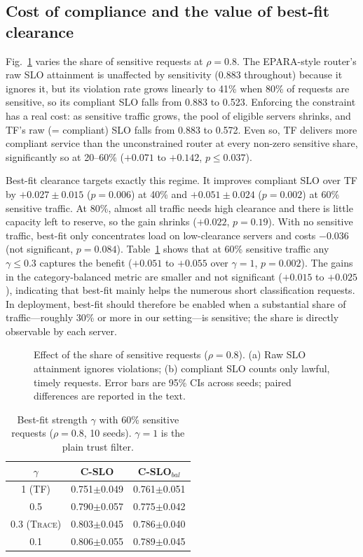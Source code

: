 \documentclass[journal]{IEEEtran}
\newcommand{\sys}{\textsc{Trace}}
\begin{document}
\subsection{Cost of compliance and the value of best-fit clearance}\label{sec:res-privacy}

Fig.~\ref{fig:privacy} varies the share of sensitive requests at $\rho=0.8$. The EPARA-style router's raw SLO attainment is unaffected by sensitivity (0.883 throughout) because it ignores it, but its violation rate grows linearly to 41\% when 80\% of requests are sensitive, so its compliant SLO falls from 0.883 to 0.523. Enforcing the constraint has a real cost: as sensitive traffic grows, the pool of eligible servers shrinks, and TF's raw (= compliant) SLO falls from 0.883 to 0.572. Even so, TF delivers more compliant service than the unconstrained router at every non-zero sensitive share, significantly so at 20--60\% ($+0.071$ to $+0.142$, $p\le0.037$).

Best-fit clearance targets exactly this regime. It improves compliant SLO over TF by $+0.027\pm0.015$ ($p=0.006$) at 40\% and $+0.051\pm0.024$ ($p=0.002$) at 60\% sensitive traffic. At 80\%, almost all traffic needs high clearance and there is little capacity left to reserve, so the gain shrinks ($+0.022$, $p=0.19$). With no sensitive traffic, best-fit only concentrates load on low-clearance servers and costs $-0.036$ (not significant, $p=0.084$). Table~\ref{tab:gamma} shows that at 60\% sensitive traffic any $\gamma\le0.3$ captures the benefit ($+0.051$ to $+0.055$ over $\gamma=1$, $p=0.002$). The gains in the category-balanced metric are smaller and not significant ($+0.015$ to $+0.025$), indicating that best-fit mainly helps the numerous short classification requests. In deployment, best-fit should therefore be enabled when a substantial share of traffic---roughly 30\% or more in our setting---is sensitive; the share is directly observable by each server.

\begin{figure}[t]
\centering
\resizebox{\columnwidth}{!}{%
}
\caption{Effect of the share of sensitive requests ($\rho=0.8$). (a) Raw SLO attainment ignores violations; (b) compliant SLO counts only lawful, timely requests. Error bars are 95\% CIs across seeds; paired differences are reported in the text.}
\label{fig:privacy}
\end{figure}

\begin{table}[t]
\centering
\caption{Best-fit strength $\gamma$ with 60\% sensitive requests ($\rho=0.8$, 10 seeds). $\gamma=1$ is the plain trust filter.}
\label{tab:gamma}
\footnotesize
\begin{tabular}{ccc}
\toprule
$\gamma$ & C-SLO & C-SLO$_{bal}$\\
\midrule
1 (TF) & 0.751$\pm$0.049 & 0.761$\pm$0.051 \\
0.5 & 0.790$\pm$0.057 & 0.775$\pm$0.042 \\
0.3 (\sys) & 0.803$\pm$0.045 & 0.786$\pm$0.040 \\
0.1 & 0.806$\pm$0.055 & 0.789$\pm$0.045 \\
\bottomrule
\end{tabular}
\end{table}
\end{document}
